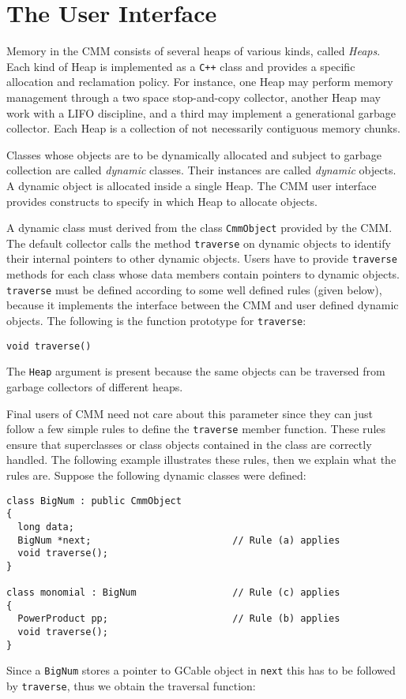 \section {The User Interface}

Memory in the CMM consists of several heaps of various kinds, called {\em
Heaps}.  Each kind of Heap is implemented as a {\tt C++} class and
provides a specific allocation and reclamation policy.  For instance, one
Heap may perform memory management through a two space stop-and-copy
collector, another Heap may work with a LIFO discipline, and a third may
implement a generational garbage collector.  Each Heap is a collection of
not necessarily contiguous memory chunks.

Classes whose objects are to be dynamically allocated and subject to garbage
collection are called {\em dynamic\/} classes.  Their instances are called {\em
dynamic\/} objects.  A dynamic object is allocated inside a single Heap.
The CMM user interface provides constructs to specify in which Heap to
allocate objects.


A dynamic class must derived from the class {\tt CmmObject} provided by the CMM.
The default collector calls the method {\tt traverse} on dynamic objects to
identify their internal pointers to other dynamic objects.  Users have to
provide {\tt traverse} methods for each class whose data members contain
pointers to dynamic objects.  {\tt traverse} must be defined according to some
well defined rules (given below), because it implements the interface between
the CMM and user defined dynamic objects.  The following is the function
prototype for {\tt traverse}:
\begin{verbatim}
void traverse()
\end{verbatim}
The {\tt Heap} argument is present because the same objects can be
traversed from garbage collectors of different heaps.

Final users of CMM need not care about this
parameter since they can just follow a few simple rules to define the
{\tt traverse} member function.  These rules ensure that superclasses or
class objects contained in the class are correctly handled.  The
following example illustrates these rules, then we explain what the rules are.
Suppose the following dynamic classes were defined:
\begin{verbatim}
class BigNum : public CmmObject
{
  long data;
  BigNum *next;                         // Rule (a) applies
  void traverse();
}

class monomial : BigNum                 // Rule (c) applies
{
  PowerProduct pp;                      // Rule (b) applies
  void traverse();
}
\end{verbatim}
Since a {\tt BigNum} stores a pointer to GCable object in
{\tt next} this has to be followed by {\tt traverse}, thus we obtain the
traversal function:

